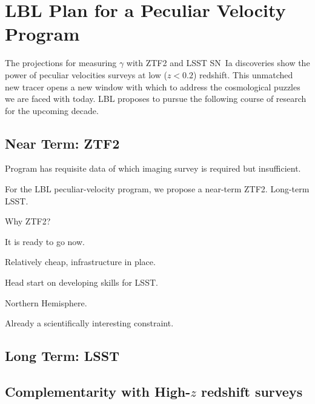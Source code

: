 \documentclass[11pt, oneside]{article}   	%
\begin{document}

\section{LBL Plan for a Peculiar Velocity Program}
The projections for measuring $\gamma$ with ZTF2 and LSST SN~Ia discoveries
show the power of peculiar velocities surveys at low ($z<0.2$) redshift.
This unmatched new tracer opens a new window with which to address
the cosmological puzzles we are faced with today.
LBL proposes to pursue the following course of research for the upcoming decade.

\subsection{Near Term: ZTF2}

Program has requisite data of which imaging survey is required but insufficient.

For the LBL peculiar-velocity program, we propose a near-term ZTF2.  Long-term LSST.

Why ZTF2?


It is ready to go now.

Relatively cheap, infrastructure in place.

Head start on developing skills for LSST.

Northern Hemisphere.

Already a scientifically interesting constraint.

\subsection{Long Term: LSST}

\subsection{Complementarity with High-$z$ redshift surveys}
\end{document}
